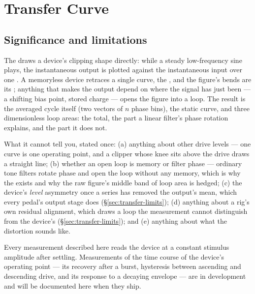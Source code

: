 \documentclass[11pt,a4paper]{article}
\begin{document}
\section{Transfer Curve}
\label{sec:transfer}

\subsection{Significance and limitations}
The  draws a device's clipping shape directly: while a
steady low-frequency sine plays, the instantaneous output is plotted against
the instantaneous input over one . A memoryless device
retraces a single curve, the , and the figure's bends are
its ; anything that makes the output depend on where the
signal has just been --- a shifting bias point, stored charge --- opens the
figure into a loop. The result is the averaged cycle itself (two vectors of
$n$ phase bins), the static curve, and three dimensionless loop areas: the
total, the part a linear filter's phase rotation explains, and the part it
does not.

What it cannot tell you, stated once: (a) anything about other drive levels
--- one curve is one operating point, and a clipper whose knee sits above
the drive draws a straight line; (b) whether an open loop is memory or
filter phase --- ordinary tone filters rotate phase and open the loop
without any memory, which is why the  exists and why the
raw figure's middle band of loop area is hedged; (c) the device's
\emph{level} asymmetry once a series  has removed
the output's mean, which every pedal's output stage does
(\S\ref{sec:transfer-limits}); (d) anything about a rig's own residual
alignment, which draws a loop the measurement cannot distinguish from the
device's (\S\ref{sec:transfer-limits}); and (e) anything about what the
distortion sounds like.

Every measurement described here reads the device at a
constant stimulus amplitude after settling. Measurements of the time
course of the device's operating point --- its recovery after a burst,
hysteresis between ascending and descending drive, and its response to a
decaying envelope --- are in development and will be documented here when
they ship.
\end{document}
